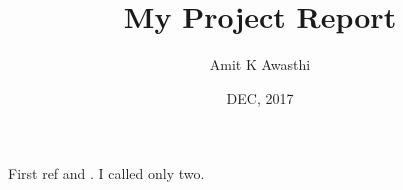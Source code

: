 \documentclass[phd]{gbuthesis}
\title{My Project Report}
\author{Amit K Awasthi}
\date{DEC, 2017}
\begin{document}
\maketitle
\declaration
\certificateofsupervisor



\tableofcontents
\listoftables
\listoffigures
{}


First ref \cite{re:bunch:rankone} and \cite{re:toolan:as03}. I called only two.


\begin{appendix}

\end{appendix}




\end{document}
